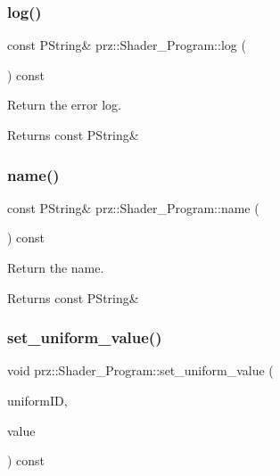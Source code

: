 \subsubsection{\texorpdfstring{log()}{log()}}
{\footnotesize\ttfamily const P\+String\& prz\+::\+Shader\+\_\+\+Program\+::log (\begin{DoxyParamCaption}{ }\end{DoxyParamCaption}) const\hspace{0.3cm}{\ttfamily [inline]}}



Return the error log. 

\begin{DoxyReturn}{Returns}
const P\+String\& 
\end{DoxyReturn}
\mbox{\label{classprz_1_1_shader___program_ab6eacdeb0d1733ea9ba6abfa00c34fe8}} 
\subsubsection{\texorpdfstring{name()}{name()}}
{\footnotesize\ttfamily const P\+String\& prz\+::\+Shader\+\_\+\+Program\+::name (\begin{DoxyParamCaption}{ }\end{DoxyParamCaption}) const\hspace{0.3cm}{\ttfamily [inline]}}



Return the name. 

\begin{DoxyReturn}{Returns}
const P\+String\& 
\end{DoxyReturn}
\mbox{\label{classprz_1_1_shader___program_a1e7289d620dc9a4567b3b5c51aed4d58}} 
\subsubsection{\texorpdfstring{set\_uniform\_value()}{set\_uniform\_value()}}
{\footnotesize\ttfamily void prz\+::\+Shader\+\_\+\+Program\+::set\+\_\+uniform\+\_\+value (\begin{DoxyParamCaption}\item[{G\+Lint}]{uniform\+ID,  }\item[{const G\+Lint \&}]{value }\end{DoxyParamCaption}) const\hspace{0.3cm}{\ttfamily [inline]}}



